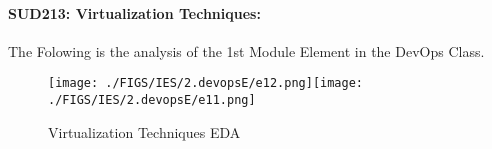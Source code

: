 \documentclass[12pt]{extreport}
\begin{document}
\paragraph{\large SUD213: Virtualization Techniques:\\
} 
The Folowing is the analysis of the 1st Module Element in the DevOps Class.
\begin{figure}[H]
	\centering
	\texttt{[image: ./FIGS/IES/2.devopsE/e12.png]}\texttt{[image: ./FIGS/IES/2.devopsE/e11.png]}
	\caption{Virtualization Techniques EDA}
	\label{fig:21}
\end{figure}



\begin{comment}


\subparagraph{Interpretation of the Box-plots:}
The numbers Below and the boxplots above show that also in this element  TSI students performance is slightly better than PSI students and half of the MP Students.
\begin{enumerate}	
	\item The PSI Class Box-Plot:
	\begin{enumerate}
		\item MAX = 20 {} {} {} {} {} {} {} {} UQ = 18 {} {} {} {} {} {} {} {} Median = 16
		\item LQ = 14 {} {} {} {} {} {} {} {} MIN = 10	e {} {} {} {} {} {} {} {} IQR = 18 - 14 = 4	
	\end{enumerate}
	\item The TSI Class Box-Plot:
	\begin{enumerate}
		\item MAX = 15  {} {} {} {} {} {} {} {} UQ = 14 {} {} {} {} {} {} {} {} Median = 12.5
		\item LQ = 11 {} {} {} {} {} {} {} {} MIN = 10.5 {} {} {} {} {} {} {} {} IQR = 14 - 11 = 3	
	\end{enumerate}
\end{enumerate}

\subparagraph{Interpretation of the histogram:}
This Frequency Distribution is (Skeness) with the following descriptive statistics:


\begin{enumerate}
	\item Mean = 14.88
	\item STD = 3.16
	\item Range = 20 - 8.25 =  11.75
	\item IQR = 17.5 - 12.5 = 5
\end{enumerate}
\end{comment}
\end{document}
